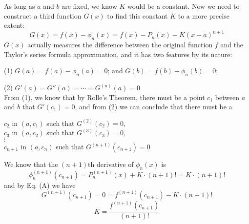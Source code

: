\documentclass[11pt]{article}
\begin{document}
As long as $a$ and $b$ are fixed,  we know $K$ would be a constant.  Now we need to construct a third function $G(x)$ to find this constant $K$ to a more precise extent: 
\begin{equation}
G(x) = f(x) - \phi _n (x) = f(x) - P_n (x) - K (x-a)^{n+1}  \tag{A}
\end{equation}
$G(x)$ actually measures the difference between the original function $f$ and the Taylor's series formula approximation,  and it has two features by its nature:

(1) $G(a) = f(a) - \phi _n (a) = 0$; and $G(b) = f(b) - \phi _n (b) = 0$;

(2) $G'(a) = G''(a) = \cdots = G^{(n)} (a) = 0$ \\

From (1),  we know that by Rolle's Theorem,  there must be a point $c_1$ between $a$ and $b$ that $G'(c_1) = 0$,  and from (2) we can conclude that there must be a 
\begin{center}
$c_2$ in $(a, c_1)$ such that $G^{(2)} (c_2) = 0$,  \\
$c_3$ in $(a,c_2)$ such that $G^{(3)} (c_3) = 0$,  \\
$ \vdots $ \\
$c_{n+1}$ in $(a, c_n)$ such that $G^{(n+1)}(c_{n+1} ) = 0$ 
\end{center}

We know that the $(n+1)$th derivative of $\phi_n(x)$ is 
$$ \phi _n ^{(n+1)} (c_{n+1} ) = P_n ^{(n+1)} (x) + K \cdot (n+1)! = K \cdot (n+1)!$$
and by Eq. (A) we have
$$
G^{(n+1)}(c_{n+1} ) = 0 = f^{(n+1)} (c_{n+1}) - K \cdot (n+1)! 
$$
$$ K = \frac{f^{(n+1)} (c_{n+1})} {(n+1)!} $$









\printbibliography [title={Reference}]


\end{document}
